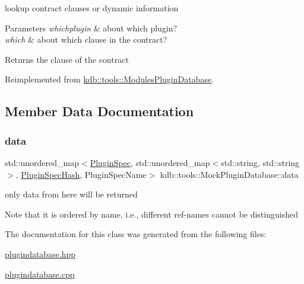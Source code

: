 lookup contract clauses or dynamic information 


\begin{DoxyParams}{Parameters}
{\em whichplugin} & about which plugin? \\
\hline
{\em which} & about which clause in the contract?\\
\hline
\end{DoxyParams}
\begin{DoxyReturn}{Returns}
the clause of the contract 
\end{DoxyReturn}


Reimplemented from \mbox{\hyperlink{classkdb_1_1tools_1_1ModulesPluginDatabase_a3f51beee8aecb4371e7d12e98958f875}{kdb\+::tools\+::\+Modules\+Plugin\+Database}}.



\subsection{Member Data Documentation}
\mbox{\label{classkdb_1_1tools_1_1MockPluginDatabase_a5de7756d9e7fb78d53903c92208d7fbe}} 
\subsubsection{\texorpdfstring{data}{data}}
{\footnotesize\ttfamily std\+::unordered\+\_\+map$<$\mbox{\hyperlink{classkdb_1_1tools_1_1PluginSpec}{Plugin\+Spec}}, std\+::unordered\+\_\+map$<$std\+::string, std\+::string$>$, \mbox{\hyperlink{structkdb_1_1tools_1_1PluginSpecHash}{Plugin\+Spec\+Hash}}, Plugin\+Spec\+Name$>$ kdb\+::tools\+::\+Mock\+Plugin\+Database\+::data\hspace{0.3cm}{\ttfamily [mutable]}}



only data from here will be returned 

\begin{DoxyNote}{Note}
that it is ordered by name, i.\+e., different ref-\/names cannot be distinguished 
\end{DoxyNote}


The documentation for this class was generated from the following files\+:\begin{DoxyCompactItemize}
\item 
\mbox{\hyperlink{plugindatabase_8hpp}{plugindatabase.\+hpp}}\item 
\mbox{\hyperlink{plugindatabase_8cpp}{plugindatabase.\+cpp}}\end{DoxyCompactItemize}
